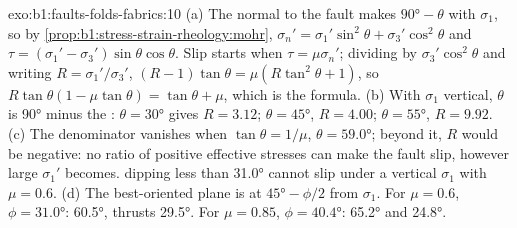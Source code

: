 \begin{solution}{exo:b1:faults-folds-fabrics:10}
(a) The normal to the fault makes $\ang{90} - \theta$ with $\sigma_1$, so by
\cref{prop:b1:stress-strain-rheology:mohr},
$\sigma_n' = \sigma_1'\sin^2\theta + \sigma_3'\cos^2\theta$ and
$\tau = (\sigma_1' - \sigma_3')\sin\theta\cos\theta$. Slip starts when
$\tau = \mu\sigma_n'$; dividing by $\sigma_3'\cos^2\theta$ and writing
$R = \sigma_1'/\sigma_3'$, $(R - 1)\tan\theta = \mu(R\tan^2\theta + 1)$, so
$R\tan\theta(1 - \mu\tan\theta) = \tan\theta + \mu$, which is the formula.
(b) With $\sigma_1$ vertical, $\theta$ is \ang{90} minus the :
$\theta = \ang{30}$ gives $R = 3.12$; $\theta = \ang{45}$, $R = 4.00$;
$\theta = \ang{55}$, $R = 9.92$. (c) The denominator vanishes when
$\tan\theta = 1/\mu$, $\theta = \ang{59.0}$; beyond it, $R$ would be negative:
no ratio of positive effective stresses can make the fault slip, however large
$\sigma_1'$ becomes.  dipping less than \ang{31.0} cannot slip
under a vertical $\sigma_1$ with $\mu = 0.6$. (d) The best-oriented plane is at
$\ang{45} - \phi/2$ from $\sigma_1$. For $\mu = 0.6$, $\phi = \ang{31.0}$:
  \ang{60.5}, thrusts \ang{29.5}. For $\mu = 0.85$,
$\phi = \ang{40.4}$: \ang{65.2} and \ang{24.8}.
\end{solution}

